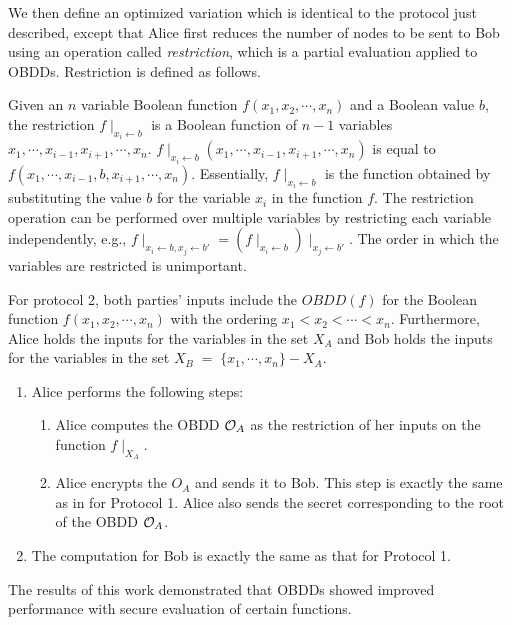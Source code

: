 %

We then define an optimized variation which is identical to the protocol
just described, except that Alice first reduces the number of nodes
to be sent to Bob using an operation called \emph{restriction}, which
is a partial evaluation applied to OBDDs. Restriction is defined as
follows. 

Given an $n$ variable Boolean function $f(x_{1},x_{2},\cdots,x_{n})$
and a Boolean value $b$, the restriction $f\mid_{x_{i}\leftarrow b}$
is a Boolean function of $n-1$ variables $x_{1},\cdots,x_{i-1},x_{i+1},\cdots,x_{n}$.
$f\mid_{x_{i}\leftarrow b}(x_{1},\cdots,x_{i-1},x_{i+1},\cdots,x_{n})$
is equal to $f(x_{1},\cdots,x_{i-1},b,x_{i+1},\cdots,x_{n})$. Essentially,
$f\mid_{x_{i}\leftarrow b}$ is the function obtained by substituting
the value $b$ for the variable $x_{i}$ in the function $f$. The
restriction operation can be performed over multiple variables by
restricting each variable independently, e.g., $f\mid_{x_{i}\leftarrow b,x_{j}\leftarrow b'}=(f\mid_{x_{i}\leftarrow b})\mid_{x_{j}\leftarrow b'}$.
The order in which the variables are restricted is unimportant.

\begin{flushleft}
For protocol 2, both parties' inputs include the $OBDD(f)$ for the
Boolean function $f(x_{1},x_{2},\cdots,x_{n})$ with the ordering
$x_{1}<x_{2}<\cdots<x_{n}$. Furthermore, Alice holds the inputs for
the variables in the set $X_{A}$ and Bob holds the inputs for the
variables in the set $X_{B}\;=\;\{x_{1},\cdots,x_{n}\}-X_{A}$. 
\par\end{flushleft}
\begin{enumerate}
\item Alice performs the following steps: 

\begin{enumerate}
\item Alice computes the OBDD ${\cal O}_{A}$ as the restriction of her
inputs on the function $f\mid_{X_{A}}$. 
\item Alice encrypts the $O_{A}$ and sends it to Bob. This step is exactly
the same as in for Protocol 1. Alice also sends the secret corresponding
to the root of the OBDD ${\cal O}_{A}$.
\end{enumerate}
\item The computation for Bob is exactly the same as that for Protocol 1.
\end{enumerate}
The results of this work demonstrated that OBDDs showed improved performance
with secure evaluation of certain functions. 

